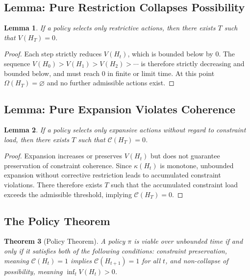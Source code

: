 \documentclass[12pt, a4paper]{article}
\theoremstyle{plain}
\newtheorem{theorem}{Theorem}[section]
\newtheorem{lemma}[theorem]{Lemma}
\theoremstyle{definition}
\theoremstyle{remark}
\begin{document}
\subsection{Lemma: Pure Restriction Collapses Possibility}

\begin{lemma}
If a policy selects only restrictive actions, then there exists $T$ such that $V(H_T) = 0$.
\end{lemma}

\begin{proof}
Each step strictly reduces $V(H_t)$, which is bounded below by $0$. The sequence $V(H_0) > V(H_1) > V(H_2) > \cdots$ is therefore strictly decreasing and bounded below, and must reach $0$ in finite or limit time. At this point $\Omega(H_T) = \varnothing$ and no further admissible actions exist.
\end{proof}

\subsection{Lemma: Pure Expansion Violates Coherence}

\begin{lemma}
If a policy selects only expansive actions without regard to constraint load, then there exists $T$ such that $\mathcal{C}(H_T) = 0$.
\end{lemma}

\begin{proof}
Expansion increases or preserves $V(H_t)$ but does not guarantee preservation of constraint coherence. Since $\kappa(H_t)$ is monotone, unbounded expansion without corrective restriction leads to accumulated constraint violations. There therefore exists $T$ such that the accumulated constraint load exceeds the admissible threshold, implying $\mathcal{C}(H_T) = 0$.
\end{proof}

\subsection{The Policy Theorem}

\begin{theorem}[Policy Theorem]
\label{thm:policy}
A policy $\pi$ is viable over unbounded time if and only if it satisfies both of the following conditions: constraint preservation, meaning $\mathcal{C}(H_t) = 1$ implies $\mathcal{C}(H_{t+1}) = 1$ for all $t$, and non-collapse of possibility, meaning $\inf_t V(H_t) > 0$.
\end{theorem}
\end{document}
